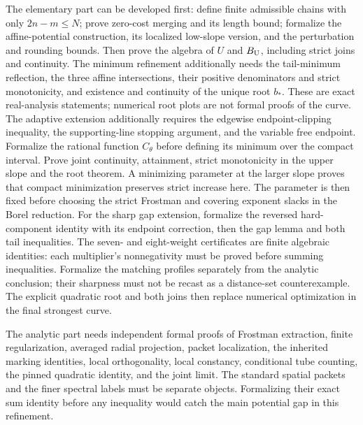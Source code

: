 \documentclass[11pt]{article}
\theoremstyle{definition}\newtheorem{remark}[theorem]{Remark}
\begin{document}
The elementary part can be developed first: define finite admissible chains
with only \(2n-m\le N\); prove zero-cost merging and its length bound;
formalize the affine-potential construction, its localized low-slope version,
and the perturbation and rounding bounds. Then prove the algebra of
\(U\) and \(B_{\rm U}\), including strict joins and continuity.
The minimum refinement additionally needs the tail-minimum reflection,
the three affine intersections, their positive denominators and strict
monotonicity, and existence and continuity of the unique root \(b_*\).
These are exact real-analysis statements; numerical root plots are not
formal proofs of the curve.
The adaptive extension additionally requires the edgewise endpoint-clipping
inequality, the supporting-line stopping argument, and the variable free
endpoint. Formalize the rational function \(C_\theta\) before defining
its minimum over the compact interval. Prove joint continuity, attainment,
strict monotonicity in the upper slope and the root theorem. A minimizing
parameter at the larger slope proves that compact minimization preserves
strict increase here. The parameter is then fixed before choosing the
strict Frostman and covering exponent slacks in the Borel reduction.
For the sharp gap extension, formalize the reversed hard-component identity
with its endpoint correction, then the gap lemma and both tail inequalities.
The seven- and eight-weight certificates are finite algebraic identities:
each multiplier's nonnegativity must be proved before summing inequalities.
Formalize the matching profiles separately from the analytic conclusion;
their sharpness must not be recast as a distance-set counterexample.
The explicit quadratic root and both joins then replace numerical
optimization in the final strongest curve.

The analytic part needs independent formal proofs of Frostman extraction,
finite regularization, averaged radial projection, packet localization,
the inherited marking identities, local orthogonality, local constancy,
conditional tube counting, the pinned quadratic identity, and the joint
limit. The standard spatial packets and the finer spectral labels must be
separate objects. Formalizing their exact sum identity before any inequality
would catch the main potential gap in this refinement.
\end{document}
